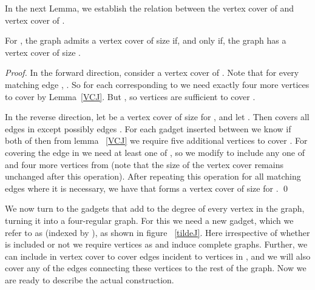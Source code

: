 \documentclass[svgnames]{llncs}
\begin{document}
{In the next Lemma, we establish the relation between the vertex cover of  and vertex cover of .

\begin{lemma}
For , the graph  admits a vertex cover of size  if, and only if, the graph  has a vertex cover of size .
\label{pvcGin4}
\end{lemma}
\begin{proof}
In the forward direction, consider a vertex cover  of . Note that for every matching edge , . So for each  corresponding to  we need exactly four more vertices to cover  by Lemma~\ref{VCJ}. But , so  vertices are sufficient to cover .

In the reverse direction, let  be a vertex cover of size  for , and let . Then  covers all edges in  except possibly edges . For each gadget  inserted between  we know if both of  then from lemma ~\ref{VCJ} we require five additional vertices to cover .
For covering the edge  in  we need at least one of , so we modify  to include any one of  and four more vertices from  (note that the size of the vertex cover remains unchanged after this operation). After repeating this operation for all matching edges where it is necessary, we have that  forms a vertex cover of size  for .
\qed

\iffalse
\begin{itemize}
 \item  :
Consider a vertex cover  of .
, . So for each  corrosponding to  we need exactly 4 more vertices 
to cover  by lemma ~\ref{VCJ}.
But , so  vertices are sufficient to cover .

\item  
Let  be a , and . Then  covers all edges in  except possibly edges 
For each gadget  inserted between  we know if both of  then from lemma ~\ref{VCJ} we require
5 more vertex to cover .
For covering the edge  in  we need at least one of , so we modify  to include any one of  and 4 more vertices from .
So that  forms a vertex cover for .


\end{itemize}
\fi

\end{proof}


We now turn to the gadgets that add to the degree of every vertex in the graph, turning it into a four-regular graph. For this we need a new gadget, which we refer to as  (indexed by ), as shown in figure ~\ref{tildeJ}. Here irrespective of whether  is 
included or not we require  vertices as  and
 induce complete graphs. Further, we can include  in vertex cover to cover edges incident to vertices in , and we will also cover any of the edges connecting these vertices to the rest of the graph. Now we are ready to describe the actual construction.  




}
\end{document}
